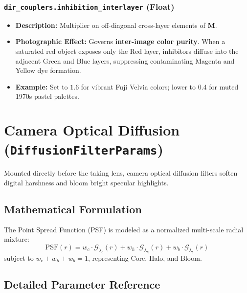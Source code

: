 \documentclass[11pt,a4paper]{article}
\begin{document}
\subsubsection{\texttt{dir\_couplers.inhibition\_interlayer} (Float)}
\begin{itemize}[leftmargin=*]
    \item \textbf{Description:} Multiplier on off-diagonal cross-layer elements of $\mathbf{M}$.
    \item \textbf{Photographic Effect:} Governs \textbf{inter-image color purity}. When a saturated red object exposes only the Red layer, inhibitors diffuse into the adjacent Green and Blue layers, suppressing contaminating Magenta and Yellow dye formation.
    \item \textbf{Example:} Set to $1.6$ for vibrant Fuji Velvia colors; lower to $0.4$ for muted 1970s pastel palettes.
\end{itemize}

\newpage

\section{Camera Optical Diffusion (\texttt{DiffusionFilterParams})}

Mounted directly before the taking lens, camera optical diffusion filters soften digital harshness and bloom bright specular highlights.

\subsection{Mathematical Formulation}
The Point Spread Function (PSF) is modeled as a normalized multi-scale radial mixture:
\begin{equation}
\mathrm{PSF}(r) = w_c \cdot \mathcal{G}_{\lambda_c}(r) + w_h \cdot \mathcal{G}_{\lambda_h}(r) + w_b \cdot \mathcal{G}_{\lambda_b}(r)
\end{equation}
subject to $w_c + w_h + w_b = 1$, representing Core, Halo, and Bloom.

\subsection{Detailed Parameter Reference}
\end{document}
